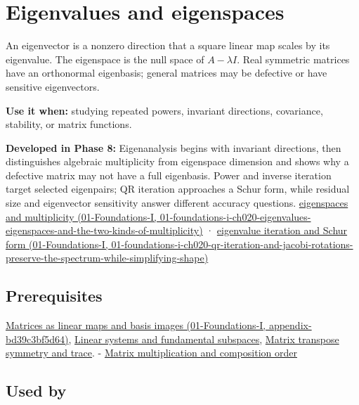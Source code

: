 \hypertarget{appendix-0b3be18411f9}{}
\section{Eigenvalues and eigenspaces}\label{appendix-0b3be18411f9-eigenvalues-and-eigenspaces}

An eigenvector is a nonzero direction that a square linear map scales by its eigenvalue. The eigenspace is the null space of \(A-\lambda I\). Real symmetric matrices have an orthonormal eigenbasis; general matrices may be defective or have sensitive eigenvectors.

\textbf{Use it when:} studying repeated powers, invariant directions, covariance, stability, or matrix functions.

\textbf{Developed in Phase 8:} Eigenanalysis begins with invariant directions, then distinguishes algebraic multiplicity from eigenspace dimension and shows why a defective matrix may not have a full eigenbasis. Power and inverse iteration target selected eigenpairs; QR iteration approaches a Schur form, while residual size and eigenvector sensitivity answer different accuracy questions. \href{../01-Foundations-I/main.pdf\#nameddest=01-foundations-i-ch020-eigenvalues-eigenspaces-and-the-two-kinds-of-multiplicity}{eigenspaces and multiplicity (01-Foundations-I, 01-foundations-i-ch020-eigenvalues-eigenspaces-and-the-two-kinds-of-multiplicity)} · \href{../01-Foundations-I/main.pdf\#nameddest=01-foundations-i-ch020-qr-iteration-and-jacobi-rotations-preserve-the-spectrum-while-simplifying-shape}{eigenvalue iteration and Schur form (01-Foundations-I, 01-foundations-i-ch020-qr-iteration-and-jacobi-rotations-preserve-the-spectrum-while-simplifying-shape)}

\subsection{Prerequisites}\label{appendix-0b3be18411f9-prerequisites}

\href{../01-Foundations-I/main.pdf\#nameddest=appendix-bd39c3bf5d64}{Matrices as linear maps and basis images (01-Foundations-I, appendix-bd39c3bf5d64)}, \hyperref[appendix-8572a4a060c1]{Linear systems and fundamental subspaces}, \hyperref[appendix-175ca5ff874d]{Matrix transpose symmetry and trace}. - \hyperref[appendix-ab31ef447dbf]{Matrix multiplication and composition order}

\subsection{Used by}\label{appendix-0b3be18411f9-used-by}

